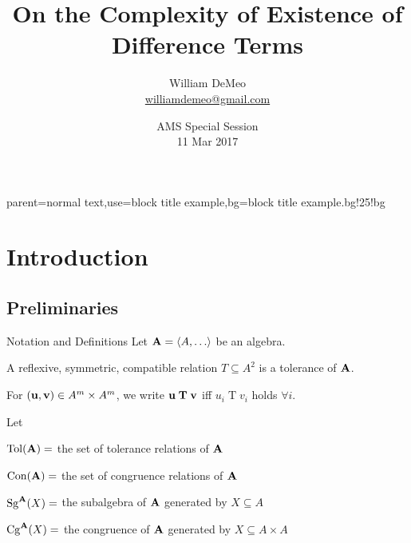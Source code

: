 \documentclass[notes=hide,12pt,xcolor=dvipsnames%
   ]{beamer}
\renewcommand{\defn}[1]{\alert{#1}}
\theoremstyle{definition}
\begin{document}
\title[Existence of Difference Terms]{On the Complexity of Existence of \\Difference Terms}
\author[\url{williamdemeo@gmail.com}]
       {William DeMeo\\
{\small \url{williamdemeo@gmail.com}}}

\date[11 Mar 2017]{AMS Special Session\\[10pt]
11 Mar 2017}

\frame[label=title]{\titlepage}

%
{parent=normal text,use=block title example,bg=block title example.bg!25!bg}

\section{Introduction}
\newcommand\oftype{\ensuremath{\mathrel{:}}}
\subsection{Preliminaries}
\begin{frame}[shrink=10,label=defs]{Notation and Definitions}
  Let $\bA = \<A, \dots\>$ be an algebra.
  
  A reflexive, symmetric, compatible relation $T\subseteq A^2$ is a
  \defn{tolerance} of $\mathbf{A}$.  

  For $(\mathbf{u}, \mathbf{v}) \in A^m\times A^m$, we write
  $\mathbf{u} \mathrel{\mathbf{T}} \mathbf{v}$ iff $u_i \mathrel{T} v_i$ holds $\forall i$.

  \pause 
  Let
  
  $\operatorname{Tol}(\mathbf{A}) = $ the set of tolerance relations of $\mathbf{A}$
  
  $\operatorname{Con}(\mathbf{A}) = $ the set of congruence relations of $\mathbf{A}$

  $\operatorname{Sg}^{\mathbf{A}}(X) = $ the subalgebra of $\mathbf{A}$ generated by $X \subseteq A$

  $\operatorname{Cg}^{\mathbf{A}}(X) = $ the congruence of $\mathbf{A}$ generated by $X \subseteq A\times A$
\end{frame}
\end{document}
